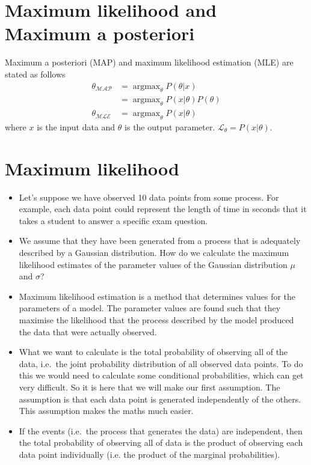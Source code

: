 \documentclass{article}
\DeclareMathOperator*{\argmax}{argmax}
\begin{document}
\section{Maximum likelihood and Maximum a posteriori}
Maximum a posteriori (MAP) and maximum likelihood estimation (MLE) are stated as follows
\begin{align*}
\theta_{\mathcal{MAP}} &= \argmax_{\theta} P(\theta|x) \nonumber \\
									&= \argmax_{\theta} P(x|\theta) P(\theta)  \nonumber \\
\theta_{\mathcal{MLE}} &= \argmax_{\theta} P(x|\theta) \nonumber
\end{align*}
where $x$ is the input data and $\theta$ is the output parameter. $\mathcal{L}_\theta = P(x|\theta)$.


\section{Maximum likelihood}

\begin{itemize}
\item Let's suppose we have observed 10 data points from some process. For example, each data point could represent the length of time in seconds that it takes a student to answer a specific exam question.
\item We assume that they have been generated from a process that is adequately described by a Gaussian distribution. How do we calculate the maximum likelihood estimates of the parameter values of the Gaussian distribution $\mu$ and $\sigma$?
\item Maximum likelihood estimation is a method that determines values for the parameters of a model. The parameter values are found such that they maximise the likelihood that the process described by the model produced the data that were actually observed.
\item What we want to calculate is the total probability of observing all of the data, i.e.\ the joint probability distribution of all observed data points. To do this we would need to calculate some conditional probabilities, which can get very difficult. So it is here that we will make our first assumption. The assumption is that each data point is generated independently of the others. This assumption makes the maths much easier. 
\item If the events (i.e.\ the process that generates the data) are independent, then the total probability of observing all of data is the product of observing each data point individually (i.e. the product of the marginal probabilities).
\end{itemize}
\end{document}
